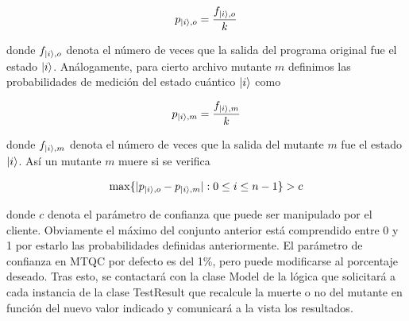 \begin{equation}
p_{\left|i\right\rangle,o}=\dfrac{f_{\left|i\right\rangle,o}}{k}
\end{equation}

donde $f_{\left|i\right\rangle,o}$ denota el número de veces que la salida del programa original fue el estado $\left|i\right\rangle$. Análogamente, para cierto archivo mutante $m$ definimos las probabilidades de medición del estado cuántico $\left|i\right\rangle$ como

\begin{equation}
p_{\left|i\right\rangle,m}=\dfrac{f_{\left|i\right\rangle,m}}{k}
\end{equation}

donde $f_{\left|i\right\rangle,m}$ denota el número de veces que la salida del mutante $m$ fue el estado $\left|i\right\rangle$. Así un mutante $m$ muere si se verifica

\begin{equation}
\max \{|p_{\left|i\right\rangle,o}-p_{\left|i\right\rangle,m}|:0\leq i\leq n - 1\}> c
\end{equation}

donde $c$ denota el parámetro de confianza que puede ser manipulado por el cliente. Obviamente el máximo del conjunto anterior está comprendido entre 0 y 1 por estarlo las probabilidades definidas anteriormente. El parámetro de confianza en MTQC por defecto es del 1\%, pero puede modificarse al porcentaje deseado. Tras esto, se contactará con la clase Model de la lógica que solicitará a cada instancia de la clase TestResult que recalcule la muerte o no del mutante en función del nuevo valor indicado y comunicará a la vista los resultados.
